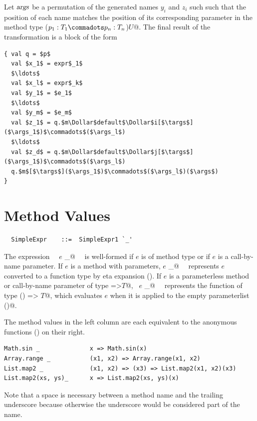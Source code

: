 Let $\mbox{\sl args}$ be a permutation of the generated names $y_i$ and $z_i$ such such
that the position of each name matches the position of its corresponding
parameter in the method type \lstinline@($p_1:T_1 \commadots p_n:T_n$)$U$@.
The final result of the transformation is a block of the form
\begin{lstlisting}
{ val q = $p$
  val $x_1$ = expr$_1$
  $\ldots$
  val $x_l$ = expr$_k$
  val $y_1$ = $e_1$
  $\ldots$
  val $y_m$ = $e_m$
  val $z_1$ = q.$m\Dollar$default$\Dollar$i[$\targs$]($\args_1$)$\commadots$($\args_l$)
  $\ldots$
  val $z_d$ = q.$m\Dollar$default$\Dollar$j[$\targs$]($\args_1$)$\commadots$($\args_l$)
  q.$m$[$\targs$]($\args_1$)$\commadots$($\args_l$)($\args$)
}
\end{lstlisting}


\section{Method Values}\label{sec:meth-vals}

\syntax\begin{lstlisting}
  SimpleExpr    ::=  SimpleExpr1 `_'
\end{lstlisting}

The expression ~~\lstinline@$e$ _@~~ is well-formed if $e$ is of method
type or if $e$ is a call-by-name parameter.  If $e$ is a method with
parameters, \lstinline@$e$ _@~~ represents $e$ converted to a function
type by eta expansion (). If $e$ is a
parameterless method or call-by-name parameter of type 
\lstinline@=>$T$@, ~\lstinline@$e$ _@~~ represents the function of type 
\lstinline@() => $T$@, which evaluates $e$ when it is applied to the empty
parameterlist \lstinline@()@. 

\example The method values in the left column are each equivalent to the 
anonymous functions () on their right.

\begin{lstlisting}
Math.sin _              x => Math.sin(x)
Array.range _           (x1, x2) => Array.range(x1, x2)
List.map2 _             (x1, x2) => (x3) => List.map2(x1, x2)(x3)
List.map2(xs, ys)_      x => List.map2(xs, ys)(x)
\end{lstlisting}

Note that a space is necessary between a method name and the trailing underscore
because otherwise the underscore would be considered part of the name.  


